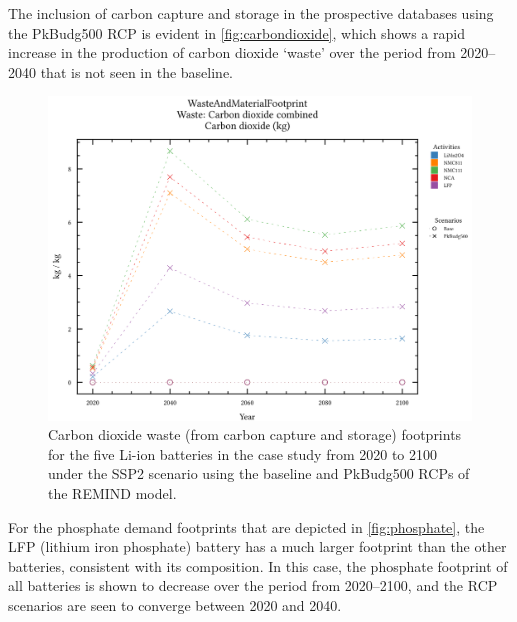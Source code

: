 The inclusion of carbon capture and storage in the prospective databases using the PkBudg500 RCP is evident in \autoref{fig:carbondioxide}, which shows a rapid increase in the production of carbon dioxide `waste' over the period from 2020--2040 that is not seen in the baseline.


\begin{figure}[ht!]
    \centering
    \includegraphics[width=\linewidth]{figures/carbondioxide.png}
    \caption{Carbon dioxide waste (from carbon capture and storage) footprints for the five Li-ion batteries in the case study from 2020 to 2100 under the SSP2 scenario using the baseline and PkBudg500 RCPs of the REMIND model.}\label{fig:carbondioxide}
\end{figure}

For the phosphate demand footprints that are depicted in \autoref{fig:phosphate}, the LFP (lithium iron phosphate) battery has a much larger footprint than the other batteries, consistent with its composition. In this case, the phosphate footprint of all batteries is shown to decrease over the period from 2020--2100, and the RCP scenarios are seen to converge between 2020 and 2040.


